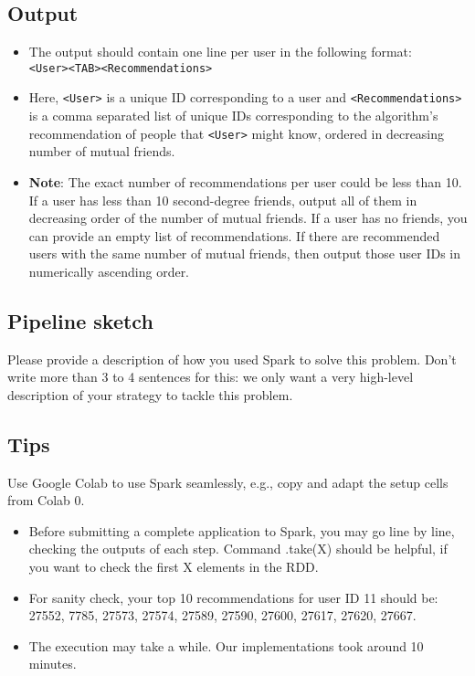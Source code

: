\documentclass[paper=a4, fontsize=11pt]{scrartcl} %
\begin{document}
\subsection{Output}
\begin{itemize}
    \item The output should contain one line per user in the following format: \\ \verb"<User><TAB><Recommendations>"
    \item Here, \verb"<User>" is a unique ID corresponding to a user and \verb"<Recommendations>" is a comma separated list of unique IDs corresponding to the algorithm’s recommendation of people that \verb"<User>" might know, ordered in decreasing number of mutual friends. 
    \item \textbf{Note}: The exact number of recommendations per user could be less than 10. If a user has less than 10 second-degree friends, output all of them in decreasing order of the number of mutual friends. If a user has no friends, you can provide an empty list of recommendations. If there are recommended users with the same number of mutual friends, then output those user IDs in numerically ascending order.
\end{itemize}

\subsection{Pipeline sketch}
Please provide a description of how you used Spark to solve this problem. Don’t write more than 3 to 4 sentences for this: we only want a very high-level description of your strategy to tackle this problem. 

\subsection{Tips}
 Use Google Colab to use Spark seamlessly, e.g., copy and adapt the setup cells from Colab 0. 
 
\begin{itemize}
    \item Before submitting a complete application to Spark, you may go line by line, checking the outputs of each step. Command .take(X) should be helpful, if you want to check the first X elements in the RDD. 
    \item For sanity check, your top 10 recommendations for user ID 11 should be: \\ 27552, 7785, 27573, 27574, 27589, 27590, 27600, 27617, 27620, 27667. 
    \item The execution may take a while. Our implementations took around 10 minutes. 
\end{itemize}
\end{document}
